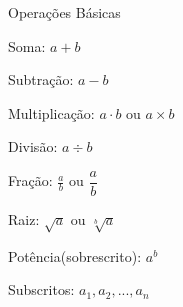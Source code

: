 \documentclass[a4paper, 12pt]{article}
\begin{document}
Operações Básicas

Soma: $a + b$

Subtração: $a - b$

Multiplicação: $a \cdot b$ ou $a \times b$

Divisão: $a \div b$

Fração: $\frac{a}{b}$ ou $\dfrac{a}{b}$

Raiz: $\sqrt{a}$ ou $\sqrt[b]{a}$

Potência(sobrescrito): $a^{b}$

Subscritos: $a_{1}, a_{2}, ..., a_{n}$
\end{document}
